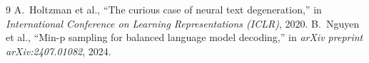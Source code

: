 \documentclass[11pt,a4paper]{article}
\theoremstyle{definition}
\begin{document}
\begin{thebibliography}{9}
 A.~Holtzman et al., ``The curious case of neural text degeneration,'' in \emph{International Conference on Learning Representations (ICLR)}, 2020.
 B.~Nguyen et al., ``Min-p sampling for balanced language model decoding,'' in \emph{arXiv preprint arXiv:2407.01082}, 2024.
\end{thebibliography}
\end{document}
